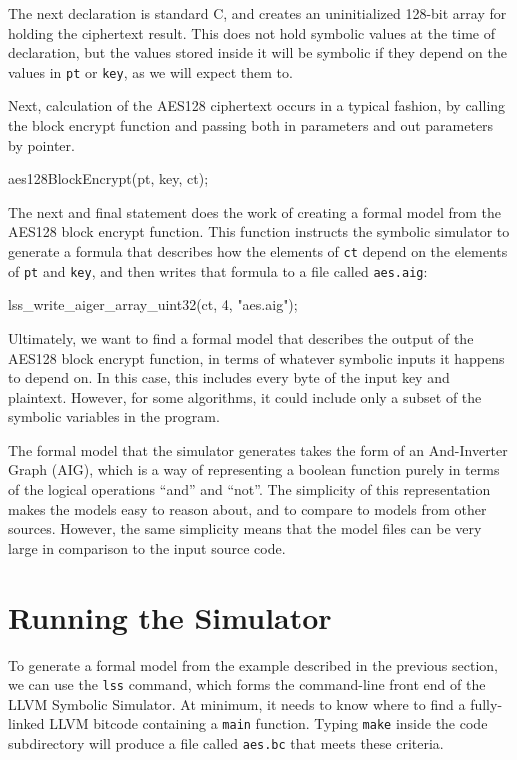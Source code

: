 \documentclass[11pt]{article}
\begin{document}
The next declaration is standard C, and creates an uninitialized 128-bit
array for holding the ciphertext result.  This does not hold symbolic
values at the time of declaration, but the values stored inside it will
be symbolic if they depend on the values in \texttt{pt} or \texttt{key},
as we will expect them to.

Next, calculation of the AES128 ciphertext occurs in a typical fashion,
by calling the block encrypt function and passing both in parameters and
out parameters by pointer.

\begin{code}
aes128BlockEncrypt(pt, key, ct);
\end{code}

The next and final statement does the work of creating a formal model
from the AES128 block encrypt function.  This function instructs the
symbolic simulator to generate a formula that describes how the elements
of \texttt{ct} depend on the elements of \texttt{pt} and \texttt{key},
and then writes that formula to a file called \texttt{aes.aig}:

\begin{code}
lss_write_aiger_array_uint32(ct, 4, "aes.aig");
\end{code}

Ultimately, we want to find a formal model that describes the output of
the AES128 block encrypt function, in terms of whatever symbolic inputs
it happens to depend on. In this case, this includes every byte of the
input key and plaintext. However, for some algorithms, it could include
only a subset of the symbolic variables in the program.

The formal model that the simulator generates takes the form of an
And-Inverter Graph (AIG), which is a way of representing a boolean
function purely in terms of the logical operations ``and'' and
``not''. The simplicity of this representation makes the models easy to
reason about, and to compare to models from other sources.  However, the
same simplicity means that the model files can be very large in
comparison to the input source code.

\section{Running the Simulator}

To generate a formal model from the example described in the previous
section, we can use the \texttt{lss} command, which forms the
command-line front end of the LLVM Symbolic Simulator. At minimum, it
needs to know where to find a fully-linked LLVM bitcode containing a
\texttt{main} function.  Typing \texttt{make} inside the code
subdirectory will produce a file called \texttt{aes.bc} that meets these
criteria.
\end{document}
